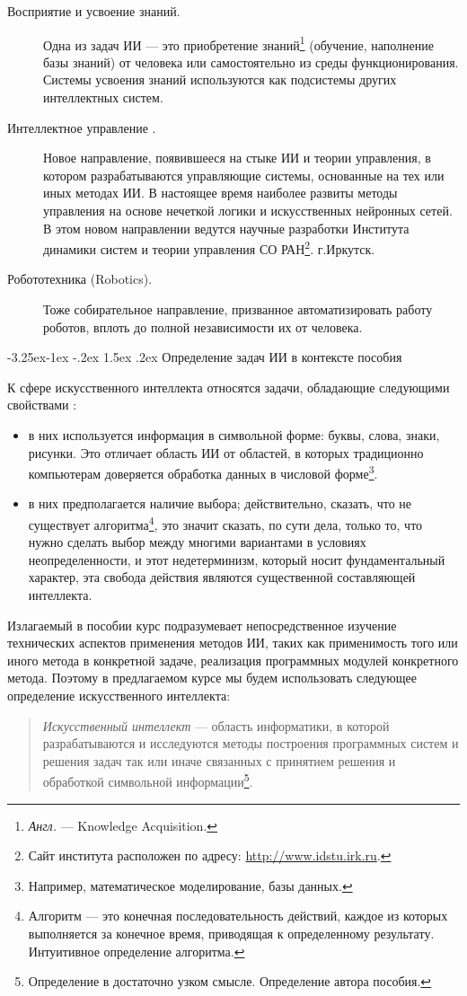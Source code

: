 \documentclass[12pt, openany, twoside]{book} %
\makeatletter
\renewcommand\subsection{\@startsection{subsection}{2}{\z@}%
                                     {-3.25ex\@plus -1ex \@minus -.2ex}%
                                     {1.5ex \@plus .2ex}%
                                     {\normalfont\normalsize\bfseries}}
\makeatother
\begin{document}
\begin{description}
 \item [Восприятие и усвоение знаний.] Одна из задач ИИ --- это приобретение знаний\footnote{\emph{Англ.} --- Knowledge Acquisition.} (обучение, наполнение базы знаний) от человека или самостоятельно из среды функционирования. Системы усвоения знаний используются как подсистемы других интеллектных систем.
 \item [Интеллектное управление \cite{Vass:2000}.] Новое направление, появившееся на стыке ИИ и теории управления, в котором разрабатываются управляющие системы, основанные на тех или иных методах ИИ. В настоящее время наиболее развиты методы управления на основе нечеткой логики и искусственных нейронных сетей. В этом новом направлении ведутся научные разработки Института динамики систем и теории управления СО РАН\footnote{Сайт института расположен по адресу: \url{http://www.idstu.irk.ru}.}. г.Иркутск.
\item [Робототехника (Robotics).] Тоже собирательное направление, призванное авто\-ма\-ти\-зировать работу роботов, вплоть до полной независимости их от человека.
\end{description}

\subsection{Определение задач ИИ в контексте пособия}

К сфере искусственного интеллекта относятся задачи, обладающие следующими свойствами \cite{Lauriere}:
 \begin{itemize}
 \item в них используется информация в символьной форме: буквы, слова, знаки, рисунки. Это отличает область ИИ от областей, в которых традиционно компьютерам доверяется обработка данных в числовой форме\footnote{Например, математическое моделирование, базы данных.}.
  \item в них предполагается наличие выбора; действительно, сказать, что не существует алгоритма\footnote{Алгоритм --- это конечная последовательность действий, каждое из которых выполняется за конечное время, приводящая к определенному результату. Интуитивное определение алгоритма.}, это значит сказать, по сути дела, только то, что нужно сделать выбор между многими вариантами в условиях неопределенности, и этот недетерминизм, который носит фундаментальный характер, эта свобода действия являются существенной составляющей интеллекта.
 \end{itemize}

Излагаемый в пособии курс подразумевает непосредственное изучение технических аспектов применения методов ИИ, таких как применимость того или иного метода в конкретной задаче, реализация программных модулей конкретного метода. Поэтому в предлагаемом курсе мы будем использовать следующее определение искусственного интеллекта:
\begin{quote}{\em
Искусственный интеллект} --- область информатики, в которой разрабатываются и исследуются методы построения программных систем и решения задач так или иначе связанных с принятием решения и обработкой символьной информации\footnote{Определение в достаточно узком смысле. Определение автора пособия.}.
\end{quote}
\end{document}
